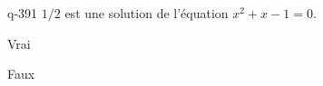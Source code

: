\begin{truefalse}{q-391}
$1/2$ est une solution de l'équation $x^2+x-1=0$.
\item Vrai
\item* Faux
\end{truefalse}

